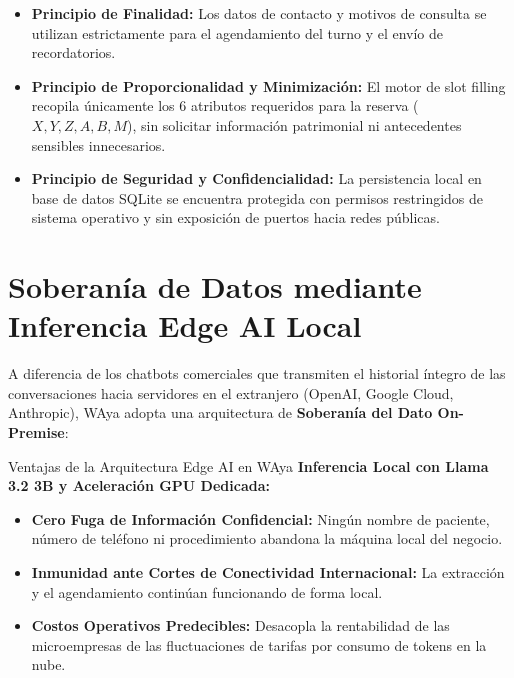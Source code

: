 \documentclass[12pt,a4paper]{report}
\begin{document}
\begin{itemize}[leftmargin=1.5em]
    \item \textbf{Principio de Finalidad:} Los datos de contacto y motivos de consulta se utilizan estrictamente para el agendamiento del turno y el envío de recordatorios.
    \item \textbf{Principio de Proporcionalidad y Minimización:} El motor de slot filling recopila únicamente los 6 atributos requeridos para la reserva ($X, Y, Z, A, B, M$), sin solicitar información patrimonial ni antecedentes sensibles innecesarios.
    \item \textbf{Principio de Seguridad y Confidencialidad:} La persistencia local en base de datos SQLite se encuentra protegida con permisos restringidos de sistema operativo y sin exposición de puertos hacia redes públicas.
\end{itemize}

\section{Soberanía de Datos mediante Inferencia Edge AI Local}
A diferencia de los chatbots comerciales que transmiten el historial íntegro de las conversaciones hacia servidores en el extranjero (OpenAI, Google Cloud, Anthropic), WAya adopta una arquitectura de \textbf{Soberanía del Dato On-Premise}:

\begin{kpicard}{Ventajas de la Arquitectura Edge AI en WAya}
\textbf{Inferencia Local con Llama 3.2 3B y Aceleración GPU Dedicada:}
\begin{itemize}[leftmargin=1.0em, topsep=2pt, itemsep=2pt]
    \item \textbf{Cero Fuga de Información Confidencial:} Ningún nombre de paciente, número de teléfono ni procedimiento abandona la máquina local del negocio.
    \item \textbf{Inmunidad ante Cortes de Conectividad Internacional:} La extracción y el agendamiento continúan funcionando de forma local.
    \item \textbf{Costos Operativos Predecibles:} Desacopla la rentabilidad de las microempresas de las fluctuaciones de tarifas por consumo de tokens en la nube.
\end{itemize}
\end{kpicard}

\end{document}

